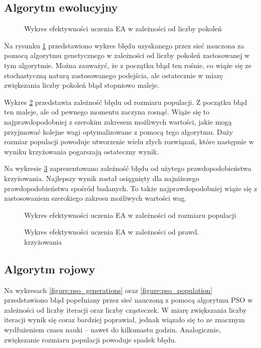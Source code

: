 \documentclass[11pt,a4paper,oneside]{report}
\begin{document}
\subsection{Algorytm ewolucyjny}

\begin{figure}[H]
	\caption{Wykres efektywności uczenia EA w zależności od liczby pokoleń \label{figure:ea_generations}}
	
\end{figure}

Na rysunku \ref{figure:ea_generations} przedstawiono wykres błędu uzyskanego przez sieć nauczona za pomocą algorytmu genetycznego w zależności od liczby pokoleń zastosowanej w tym algorytmie. Można zauważyć, że z początku błąd ten rośnie, co wiąże się ze stochastyczną naturą zastosowanego podejścia, ale ostatecznie w miarę zwiększania liczby pokoleń błąd stopniowo maleje. 

Wykres \ref{figure:ea_population} przedstawia zależność błędu od rozmiaru populacji. Z początku błąd ten maleje, ale od pewnego momentu zaczyna rosnąć. Wiąże się to najprawdopodobniej z szerokim zakresem możliwych wartości, jakie mogą przyjmować kolejne wagi optymalizowane z pomocą tego algorytmu. Duży rozmiar populacji powoduje utworzenie wielu złych rozwiązań, które następnie w wyniku krzyżowania pogarszają ostateczny wynik.

Na wykresie \ref{figure:ea_cp} zaprezentowano zależność błędu od użytego prawdopodobieństwa krzyżowania. Najlepszy wynik został osiągnięty dla najniższego prawdopodobieństwa spośród badanych. To także najprawdopodobniej wiąże się z zastosowaniem szerokiego zakresu możliwych wartości wag.

\begin{figure}[H]
	\caption{Wykres efektywności uczenia EA w zależności od rozmiaru populacji \label{figure:ea_population}}
	
\end{figure}

\begin{figure}[H]
	\caption{Wykres efektywności uczenia EA w zależności od prawd. krzyżowania \label{figure:ea_cp}}
	
\end{figure}

\subsection{Algorytm rojowy}

Na wykresach \ref{figure:pso_generations} oraz \ref{figure:pso_population} przedstawiono błąd popełniany przez sieć nauczoną z pomocą algorytmu PSO w zależności od liczby iteracji oraz liczby cząsteczek. W miarę zwiększania liczby iteracji wynik się coraz bardziej poprawiał, jednak wiązało się to ze znacznym wydłużeniem czasu nauki -- nawet do kilkunastu godzin. Analogicznie, zwiększanie rozmiaru populacji powoduje spadek błędu.
\end{document}

